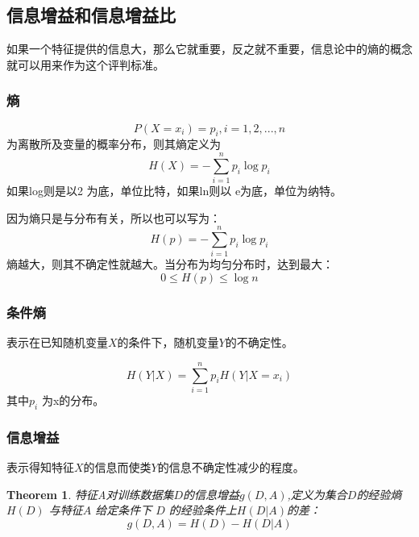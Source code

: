 \documentclass[UTF8]{ctexart}
\newtheorem{thm}{\bf Theorem}[section]
\begin{document}
\subsection{信息增益和信息增益比}
如果一个特征提供的信息大，那么它就重要，反之就不重要，信息论中的熵的概念就可以用来作为这个评判标准。

\subsubsection{熵}
$$
P(X=x_i) = p_i, i = 1,2,...,n
$$
为离散所及变量的概率分布，则其熵定义为
$$
H(X) = - \sum_{i=1}^{n} p_i \log p_i 
$$
如果log则是以2 为底，单位比特，如果ln则以
e为底，单位为纳特。

因为熵只是与分布有关，所以也可以写为：
$$
H(p) = - \sum_{i=1}^{n} p_i \log p_i 
$$
熵越大，则其不确定性就越大。当分布为均匀分布时，达到最大：
$$
0 \le H(p) \le \log n 
$$

\subsubsection{条件熵}
表示在已知随机变量$X$的条件下，随机变量$Y$的不确定性。

$$
H(Y|X) = \sum_{i=1}^{n} p_i H(Y|X=x_i)
$$
其中$p_i$ 为x的分布。

\subsubsection{信息增益}
表示得知特征$X$的信息而使类$Y$的信息不确定性减少的程度。
\begin{thm}
	特征A对训练数据集$D$的信息增益$g(D,A)$,定义为集合$D$的经验熵 $H(D)$ 与特征$A$ 给定条件下 $D$ 的经验条件上$H(D|A)$的差：
	$$
	g(D,A) = H(D) - H(D|A)
	$$
\end{thm} 
\end{document}
